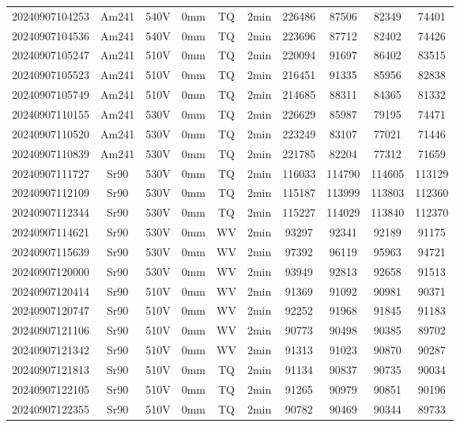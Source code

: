 \begin{center}
{\begin{longtable}{c c c c c c c c c c}
    20240907104253 & Am241 & 540V & 0mm & TQ & 2min & 226486 & 87506 & 82349 & 74401 \\
    20240907104536 & Am241 & 540V & 0mm & TQ & 2min & 223696 & 87712 & 82402 & 74426 \\
    20240907105247 & Am241 & 510V & 0mm & TQ & 2min & 220094 & 91697 & 86402 & 83515 \\
    20240907105523 & Am241 & 510V & 0mm & TQ & 2min & 216451 & 91335 & 85956 & 82838 \\
    20240907105749 & Am241 & 510V & 0mm & TQ & 2min & 214685 & 88311 & 84365 & 81332 \\
    20240907110155 & Am241 & 530V & 0mm & TQ & 2min & 226629 & 85987 & 79195 & 74471 \\
    20240907110520 & Am241 & 530V & 0mm & TQ & 2min & 223249 & 83107 & 77021 & 71446 \\
    20240907110839 & Am241 & 530V & 0mm & TQ & 2min & 221785 & 82204 & 77312 & 71659 \\
    20240907111727 & Sr90 & 530V & 0mm & TQ & 2min & 116033 & 114790 & 114605 & 113129 \\
    20240907112109 & Sr90 & 530V & 0mm & TQ & 2min & 115187 & 113999 & 113803 & 112360 \\
    20240907112344 & Sr90 & 530V & 0mm & TQ & 2min & 115227 & 114029 & 113840 & 112370 \\
    20240907114621 & Sr90 & 530V & 0mm & WV & 2min & 93297 & 92341 & 92189 & 91175 \\
    20240907115639 & Sr90 & 530V & 0mm & WV & 2min & 97392 & 96119 & 95963 & 94721 \\
    20240907120000 & Sr90 & 530V & 0mm & WV & 2min & 93949 & 92813 & 92658 & 91513 \\
    20240907120414 & Sr90 & 510V & 0mm & WV & 2min & 91369 & 91092 & 90981 & 90371 \\
    20240907120747 & Sr90 & 510V & 0mm & WV & 2min & 92252 & 91968 & 91845 & 91183 \\
    20240907121106 & Sr90 & 510V & 0mm & WV & 2min & 90773 & 90498 & 90385 & 89702 \\
    20240907121342 & Sr90 & 510V & 0mm & WV & 2min & 91313 & 91023 & 90870 & 90287 \\
    20240907121813 & Sr90 & 510V & 0mm & TQ & 2min & 91134 & 90837 & 90735 & 90034 \\
    20240907122105 & Sr90 & 510V & 0mm & TQ & 2min & 91265 & 90979 & 90851 & 90196 \\
    20240907122355 & Sr90 & 510V & 0mm & TQ & 2min & 90782 & 90469 & 90344 & 89733 \\

\end{longtable}}
\end{center}
